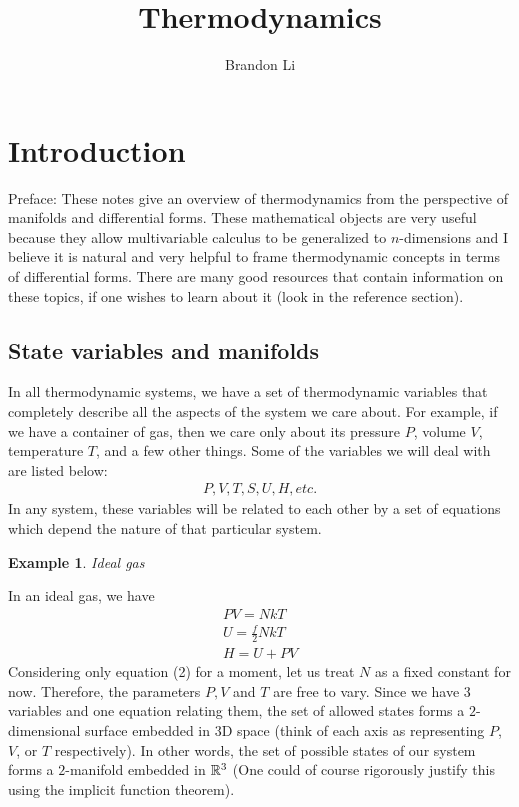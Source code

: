 \documentclass[12pt]{article}
\title{Thermodynamics}
\author{Brandon Li}
\newtheorem{example}{Example}
\begin{document}
\maketitle
\section{Introduction}
Preface: These notes give an overview of thermodynamics from the perspective of manifolds and differential forms. These mathematical objects are very useful because they allow multivariable calculus to be generalized to $n$-dimensions and I believe it is natural and very helpful to frame thermodynamic concepts in terms of differential forms. There are many good resources that contain information on these topics, if one wishes to learn about it (look in the reference section).
\subsection{State variables and manifolds}
In all thermodynamic systems, we have a set of thermodynamic variables that completely describe all the aspects of the system we care about. For example, if we have a container of gas, then we care only about its pressure $P$, volume $V$, temperature $T$, and a few other things. Some of the variables we will deal with are listed below:
\begin{gather}
    P, V, T, S, U, H, etc.
\end{gather}
In any system, these variables will be related to each other by a set of equations which depend the nature of that particular system.
\begin{example}
Ideal gas
\end{example}
In an ideal gas, we have
\begin{gather}
    PV=NkT\\
    U = \frac{f}{2}N k T\\
    H = U+PV
\end{gather}
Considering only equation (2) for a moment, let us treat $N$ as a fixed constant for now. Therefore, the parameters $P, V$ and $T$ are free to vary. Since we have $3$ variables and one equation relating them, the set of allowed states forms a $2$-dimensional surface embedded in $3$D space (think of each axis as representing $P$, $V$, or $T$ respectively). In other words, the set of possible states of our system forms a $2$-manifold embedded in $\mathbb{R}^3$ (One could of course rigorously justify this using the implicit function theorem).
\par
\end{document}

